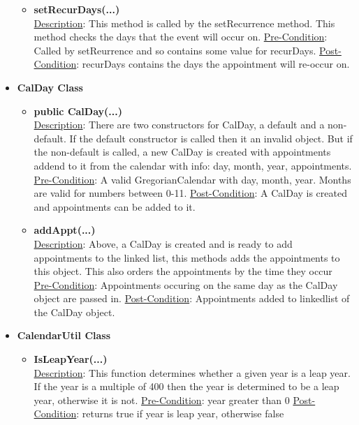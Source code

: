 \documentclass[12pt]{article}
\begin{document}
\begin{itemize}
\begin{itemize}
	\item \textbf {setRecurDays(...)}  \\
	\underline{Description}: This method is called by the setRecurrence method. This method checks the days that the event will occur on. \newline
	\underline{Pre-Condition}: Called by setReurrence and so contains some value for recurDays. \newline
	\underline{Post-Condition}: recurDays contains the days the appointment will re-occur on. 
	\end{itemize}

\item \textbf {CalDay Class}
	\begin{itemize}

	\item \textbf {public CalDay(...)} \\
	\underline{Description}: There are two constructors for CalDay, a default and a non-default. If the default constructor is called then it an invalid object. But if the non-default is called, a new CalDay is created with appointments addend to it from the calendar with info: day, month, year, appointments. \newline
	\underline{Pre-Condition}: A valid GregorianCalendar with day, month, year. Months are valid for numbers between 0-11. \newline
	\underline{Post-Condition}: A CalDay is created and appointments can be added to it. 

	\item \textbf {addAppt(...)}\\
	\underline{Description}: Above, a CalDay is created and is ready to add appointments to the linked list, this methods adds the appointments to this object. This also orders the appointments by the time they occur\newline
	\underline{Pre-Condition}: Appointments occuring on the same day as the CalDay object are passed in. \newline
	\underline{Post-Condition}: Appointments added to linkedlist of the CalDay object.
	\end{itemize}

\item \textbf {CalendarUtil Class}
	\begin{itemize} 
	\item \textbf {IsLeapYear(...)} \\
	\underline{Description}: This function determines whether a given year is a leap year. If the year is a multiple of 400 then the year is determined to be a leap year, otherwise it is not. \newline
	\underline{Pre-Condition}: year greater than 0 \newline
	\underline{Post-Condition}: returns true if year is leap year, otherwise false  
	\end{itemize}


\end{itemize}
\end{document}
